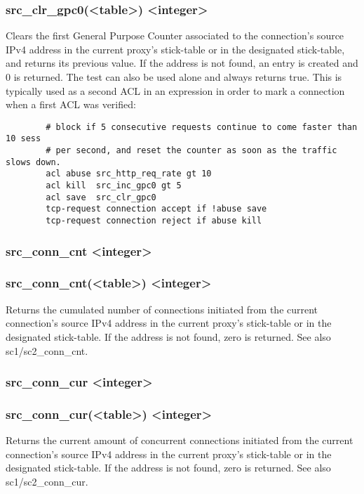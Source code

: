 \subsubsection{src\_clr\_gpc0(<table>) <integer>}
  Clears the first General Purpose Counter associated to the connection's
  source IPv4 address in the current proxy's stick-table or in the designated
  stick-table, and returns its previous value. If the address is not found, an
  entry is created and 0 is returned. The test can also be used alone and
  always returns true. This is typically used as a second ACL in an expression
  in order to mark a connection when a first ACL was verified:

\begin{verbatim}
        # block if 5 consecutive requests continue to come faster than 10 sess
        # per second, and reset the counter as soon as the traffic slows down.
        acl abuse src_http_req_rate gt 10
        acl kill  src_inc_gpc0 gt 5
        acl save  src_clr_gpc0
        tcp-request connection accept if !abuse save
        tcp-request connection reject if abuse kill
\end{verbatim}

\subsubsection[src\_conn\_cnt]{src\_conn\_cnt <integer>}
\subsubsection{src\_conn\_cnt(<table>) <integer>}
  Returns the cumulated number of connections initiated from the current
  connection's source IPv4 address in the current proxy's stick-table or in
  the designated stick-table. If the address is not found, zero is returned.
  See also sc1/sc2\_conn\_cnt.

\subsubsection[src\_conn\_cur]{src\_conn\_cur <integer>}
\subsubsection{src\_conn\_cur(<table>) <integer>}
  Returns the current amount of concurrent connections initiated from the
  current connection's source IPv4 address in the current proxy's stick-table
  or in the designated stick-table. If the address is not found, zero is
  returned. See also sc1/sc2\_conn\_cur.

